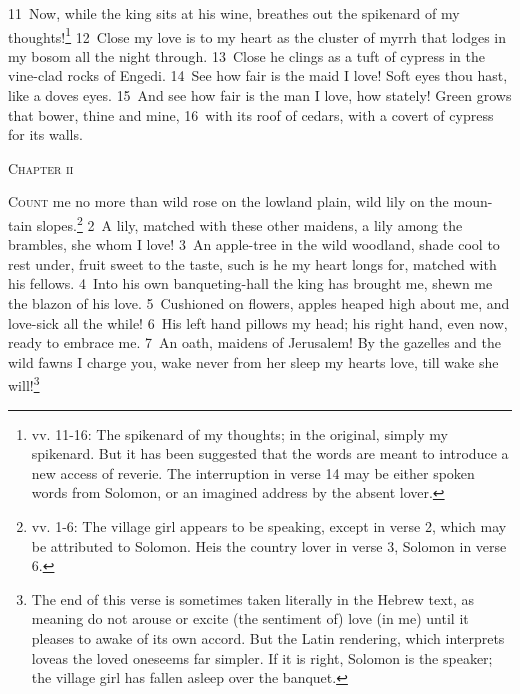 \documentclass[10pt]{book} %
\begin{document}
\textcolor{benred8}{11}~Now, while the king sits at his wine, breathes out the spikenard of my thoughts!\footnote[4]{vv. 11-16: \textasciigrave The spikenard of my thoughts\textquotesingle ; in the original, simply \textasciigrave my spikenard\textquotesingle . But it has been suggested that the words are meant to introduce a new access of reverie. The interruption in verse 14 may be either spoken words from Solomon, or an imagined address by the absent lover.} \textcolor{benred8}{12}~Close my love is to my heart as the cluster of myrrh that lodges in my bosom all the night through. \textcolor{benred8}{13}~Close he clings as a tuft of cypress in the vine-clad rocks of Engedi.
\textcolor{benred8}{14}~See how fair is the maid I love! Soft eyes thou hast, like a dove\textquotesingle s eyes.
\textcolor{benred8}{15}~And see how fair is the man I love, how stately! Green grows that bower, thine and mine, \textcolor{benred8}{16}~with its roof of cedars, with a covert of cypress for its walls.
\begin{large}\begin{center}\textsc{Chapter ii}\end{center}\end{large}
\lettrine[lines=2]{C}{ount} me no more than wild rose on the lowland plain, wild lily on the moun-tain slopes.\footnote[1]{vv. 1-6: The village girl appears to be speaking, except in verse 2, which may be attributed to Solomon. \textasciigrave He\textquotesingle  is the country lover in verse 3, Solomon in verse 6.}
\textcolor{benred8}{2}~A lily, matched with these other maidens, a lily among the brambles, she whom I love!
\textcolor{benred8}{3}~An apple-tree in the wild woodland, shade cool to rest under, fruit sweet to the taste, such is he my heart longs for, matched with his fellows.
\textcolor{benred8}{4}~Into his own banqueting-hall the king has brought me, shewn me the blazon of his love. \textcolor{benred8}{5}~Cushioned on flowers, apples heaped high about me, and love-sick all the while! \textcolor{benred8}{6}~His left hand pillows my head; his right hand, even now, ready to embrace me.
\textcolor{benred8}{7}~An oath, maidens of Jerusalem! By the gazelles and the wild fawns I charge you, wake never from her sleep my heart\textquotesingle s love, till wake she will!\footnote[2]{The end of this verse is sometimes taken literally in the Hebrew text, as meaning \textasciigrave do not arouse or excite (the sentiment of) love (in me) until it pleases to awake of its own accord\textquotesingle . But the Latin rendering, which interprets \textasciigrave love\textquotesingle  as \textasciigrave the loved one\textquotesingle  seems far simpler. If it is right, Solomon is the speaker; the village girl has fallen asleep over the banquet.}
\end{document}
